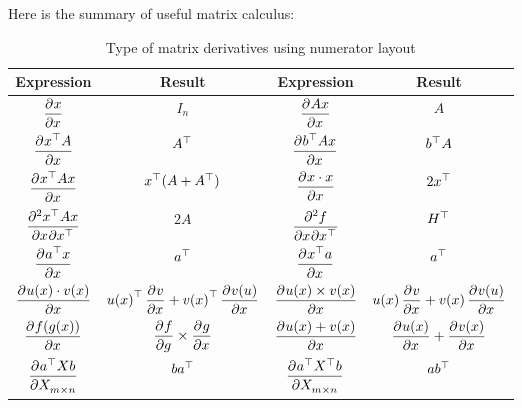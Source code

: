 Here is the summary of useful matrix calculus:

\begin{table}[H]
\centering
\renewcommand*{\arraystretch}{2.5}
\begin{tabular}[t]{cccc}
\hline
Expression & Result & Expression & Result \\ \hline
$\dpd{{x}}{{x}}$ & $I_n$ & $\dpd{A {x}}{{x}}$ & $A$\\[1ex]
$\dpd{\transpose{{x}}A}{{x}}$ & ${A}^\top$ & $\dpd{\transpose{b}A {x}}{{x}}$ & ${b}^\top A$ \\[1ex] 
$\dpd{\transpose{{x}}A {x}}{{x}}$ & $ {{x}}^\top(A + {A}^\top)$ & $\dpd{x \cdot x}{{x}}$ & $ 2{{x}}^\top$ \\[1ex] 
$\dmd{{\transpose{{x}}A {x}}}{2}{{x}}{}{{\transpose{{x}}}}{}$ & $2A$ & $\dmd{f}{2}{{x}}{}{{\transpose{{x}}}}{}$ & ${H}^\top$  \\[1ex] 
$\dpd{\transpose{a}x}{x}$ & ${a}^\top$ & $\dpd{\transpose{x}a}{x}$ & ${a}^\top$  \\[1ex] 
$\dpd{u(x) \cdot v(x)}{x}$ & $\transpose{u(x)} \dpd{v}{x} + \transpose{v(x)} \dpd{v(u)}{x}$ & $\dpd{u(x) \times v(x)}{x}$ & $u(x) \dpd{v}{x} + v(x) \dpd{v(u)}{x}$  \\[1ex] 
$\dpd{f(g(x))}{x}$ & $\dpd{f}{g} \times \dpd{g}{x}$ & $\dpd{u(x) + v(x)}{x}$ & $\dpd{u(x)}{x} + \dpd{v(x)}{x}$ \\[1ex] 
$\dpd{\transpose{a}X b}{X_{m \times n}}$ & $b {a}^\top$ & $\dpd{\transpose{a} \transpose{X} b}{X_{m \times n}}$ & $a {b}^\top$ \\[1ex] \hline
\end{tabular}

\caption{Type of matrix derivatives using numerator layout}
\end{table}






























